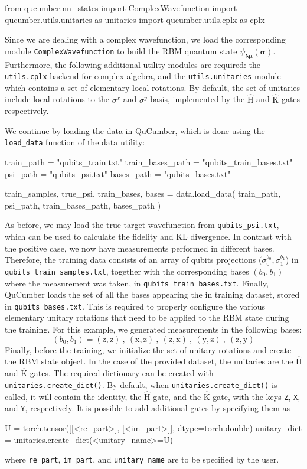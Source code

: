 \documentclass[submission, Phys, hidelnks]{SciPost}
\begin{document}
\begin{python}
from qucumber.nn_states import ComplexWavefunction
import qucumber.utils.unitaries as unitaries
import qucumber.utils.cplx as cplx
\end{python}
Since we are dealing with a complex wavefunction, we load the corresponding module
\verb|ComplexWavefunction| to build the RBM quantum state
$\psi_{\bm{\lambda\mu}}(\bm{\sigma})$. Furthermore, the following additional
utility modules are required: the \verb|utils.cplx| backend for complex algebra,
and the \verb|utils.unitaries| module  which contains a set of elementary local
rotations. By default, the set of unitaries include local rotations to the
$\sigma^x$ and $\sigma^y$ basis, implemented by the $\hat{\mathrm{H}}$ and
$\hat{\mathrm{K}}$ gates respectively.

We continue by loading the data in QuCumber, which is done using the
\verb|load_data| function of the data utility:
\begin{python}
train_path = "qubits_train.txt"
train_bases_path = "qubits_train_bases.txt"
psi_path = "qubits_psi.txt"
bases_path = "qubits_bases.txt"

train_samples, true_psi, train_bases, bases = data.load_data(
  train_path, psi_path, train_bases_path, bases_path
)
\end{python}
As before, we may load the true target wavefunction from \verb|qubits_psi.txt|,
which can be used to calculate the fidelity and KL divergence. In contrast with
the positive case, we now have measurements performed in different bases.
Therefore, the training data consists of an array of qubits projections
$(\sigma_0^{b_0},\sigma_1^{b_1}$) in \verb|qubits_train_samples.txt|, together
with the corresponding bases $(b_0,b_1)$ where the measurement was taken, in
\verb|qubits_train_bases.txt|. Finally, QuCumber loads the set of all the bases
appearing the in training dataset, stored in \verb|qubits_bases.txt|. This is
required to properly configure the various elementary unitary rotations that
need to be applied to the RBM state during the training. For this example, we
generated measurements in the following bases:
\begin{equation}
    (b_0, b_1)=(\mathrm{z},\mathrm{z})\:,\:(\mathrm{x},\mathrm{z})\:,\:(\mathrm{z},\mathrm{x})\:,\:(\mathrm{y},\mathrm{z})\:,\:(\mathrm{z},\mathrm{y})
\end{equation}
Finally, before the training, we initialize the set of unitary rotations and
create the RBM state object. In the case of the provided dataset, the unitaries
are the $\hat{\mathrm{H}}$ and $\hat{\mathrm{K}}$ gates. The required dictionary
can be created with \verb|unitaries.create_dict()|.
By default, when \verb|unitaries.create_dict()| is called, it will contain the
identity, the $\hat{\mathrm{H}}$ gate, and the $\hat{\mathrm{K}}$ gate, with the
keys \verb|Z|, \verb|X|, and \verb|Y|, respectively. It is possible to add
additional gates by specifying them as
\begin{python}
U = torch.tensor([[<re_part>], [<im_part>]], dtype=torch.double)
unitary_dict = unitaries.create_dict(<unitary_name>=U)
\end{python}
where \verb|re_part|, \verb|im_part|, and \verb|unitary_name| are to be
specified by the user.
\end{document}
